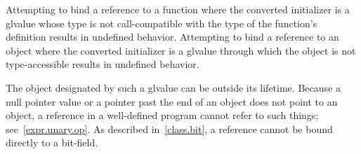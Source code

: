 \pnum
Attempting to bind a reference to a function where
the converted initializer is a glvalue whose
type is not call-compatible
with the type of the function's definition
results in undefined behavior.
%
%
%
%
%
Attempting to bind a reference to an object where
the converted initializer is a glvalue through which
the object is not type-accessible
results in undefined behavior.
%
%
%
%
%
\begin{note}
%
The object designated by such a glvalue can be
outside its lifetime.
Because a null pointer value or a pointer past the end of an object
does not point to an object,
a reference in a well-defined program cannot refer to such things;
see~\ref{expr.unary.op}.
As described in~\ref{class.bit}, a reference cannot be bound directly
to a bit-field.
\end{note}
